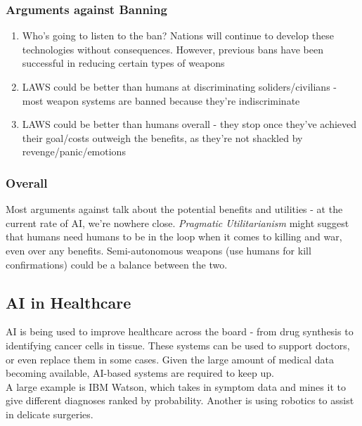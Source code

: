 \subsubsection{Arguments against Banning}
\begin{enumerate}
    \item Who's going to listen to the ban? Nations will continue to develop these technologies without consequences. However, previous bans have been successful in reducing certain types of weapons
    \item LAWS could be better than humans at discriminating soliders/civilians - most weapon systems are banned because they're indiscriminate
    \item LAWS could be better than humans overall - they stop once they've achieved their goal/costs outweigh the benefits, as they're not shackled by revenge/panic/emotions
\end{enumerate}

\subsubsection{Overall}
Most arguments against talk about the potential benefits and utilities - at the current rate of AI, we're nowhere close. \emph{Pragmatic Utilitarianism} might suggest that humans need humans to be in the loop when it comes to killing and war, even over any benefits. Semi-autonomous weapons (use humans for kill confirmations) could be a balance between the two. 


\subsection{AI in Healthcare}
AI is being used to improve healthcare across the board - from drug synthesis to identifying cancer cells in tissue. These systems can be used to support doctors, or even replace them in some cases. Given the large amount of medical data becoming available, AI-based systems are required to keep up.\\

A large example is IBM Watson, which takes in symptom data and mines it to give different diagnoses ranked by probability. Another is using robotics to assist in delicate surgeries.


